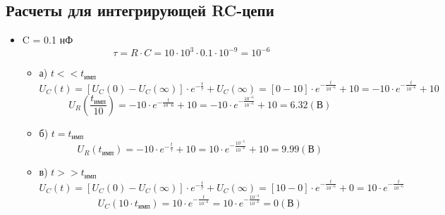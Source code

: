 \subsection{Расчеты для интегрирующей RC-цепи}

\begin{itemize}
\item C = 0.1 нФ\\
\begin{equation}
		\tau = R \cdot C = 10 \cdot 10^3 \cdot 0.1 \cdot 10^{-9} = 10^{-6}
	\end{equation}
\begin{itemize}
\item[] а) $t << t_\text{имп}$\\
	\begin{equation}
		U_C(t) = [U_C(0) - U_C(\infty)] \cdot e^{-\frac{t}{\tau}} + U_C(\infty) = [0 - 10] \cdot e^{-\frac{t}{10^{-6}}} + 10 = -10 \cdot e^{-\frac{t}{10^{-6}}} + 10
	\end{equation}
	\begin{equation}
		U_R(\frac{t_\text{имп}}{10}) = -10 \cdot e^{-\frac{t}{10^-6}} + 10 = -10 \cdot e^{-\frac{10^{-6}}{10^{-6}}} + 10 = 6.32 (\text{В})
	\end{equation}

\item[] б) $t = t_\text{имп}$\\
	\begin{equation}
		U_R(t_\text{имп}) = -10 \cdot e^{-\frac{t}{\tau}} + 10 = 10 \cdot e^{-\frac{10^{-5}}{10^{-6}}} + 10 = 9.99 (\text{В})
	\end{equation}
	
\item[] в) $t >> t_\text{имп}$\\
	\begin{equation}
		U_C(t) = [U_C(0) - U_C(\infty)] \cdot e^{-\frac{t}{\tau}} + U_C(\infty) = [10 - 0] \cdot e^{-\frac{t}{10^{-6}}} + 0 = 10 \cdot e^{-\frac{t}{10^{-6}}}
	\end{equation}
	\begin{equation}
		U_C(10 \cdot t_\text{имп}) = 10 \cdot e^{-\frac{t}{10^{-6}}} = 10 \cdot e^{-\frac{10^{-4}}{10^{-6}}} = 0 (\text{В})
	\end{equation}
\end{itemize}


\end{itemize}
